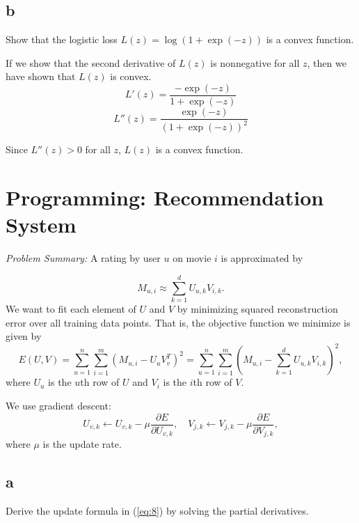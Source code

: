 \documentclass{article}
\begin{document}
\subsection{b}
Show that the logistic loss $L(z) = \log(1 + \exp(-z))$ is a convex function.

If we show that the second derivative of $L(z)$ is nonnegative for all $z$, then we have shown that $L(z)$ is convex.
$$L'(z) = \frac{-\exp(-z)}{1 + \exp(-z)}$$
$$L''(z) = \frac{\exp(-z)}{(1 + \exp(-z))^2}$$

Since \(L''(z) > 0\) for all \(z\), \(L(z)\) is a convex function.

\section{Programming: Recommendation System}

\emph{Problem Summary:}
A rating by user $u$ on movie $i$ is approximated by

\begin{equation} \label{eq:5}
M_{u,i} \approx \sum_{k=1}^{d}{U_{u,k}V_{i,k}}.
\end{equation}
We want to fit each element of $U$ and $V$ by minimizing squared reconstruction error over all training data points.
That is, the objective function we minimize is given by
\begin{equation} \label{eq:6}
E(U,V) = \sum_{u=1}^n\sum_{i=1}^m{(M_{u,i} - U_uV_v^T)^2} = \sum_{u=1}^n\sum_{i=1}^m{(M_{u,i} - \sum_{k=1}^d{U_{u,k}V_{i,k}})^2},
\end{equation}
where $U_u$ is the $u$th row of $U$ and $V_i$ is the $i$th row of $V$.

We use gradient descent:
\begin{equation} \label{eq:8}
    U_{v,k} \leftarrow U_{v,k} - \mu \frac{\partial E}{\partial U_{v,k}}, \quad V_{j,k} \leftarrow V_{j,k} - \mu \frac{\partial E}{\partial V_{j,k}},
\end{equation}
where $\mu$ is the update rate.

\subsection{a}
Derive the update formula in (\ref{eq:8}) by solving the partial derivatives.
\end{document}
